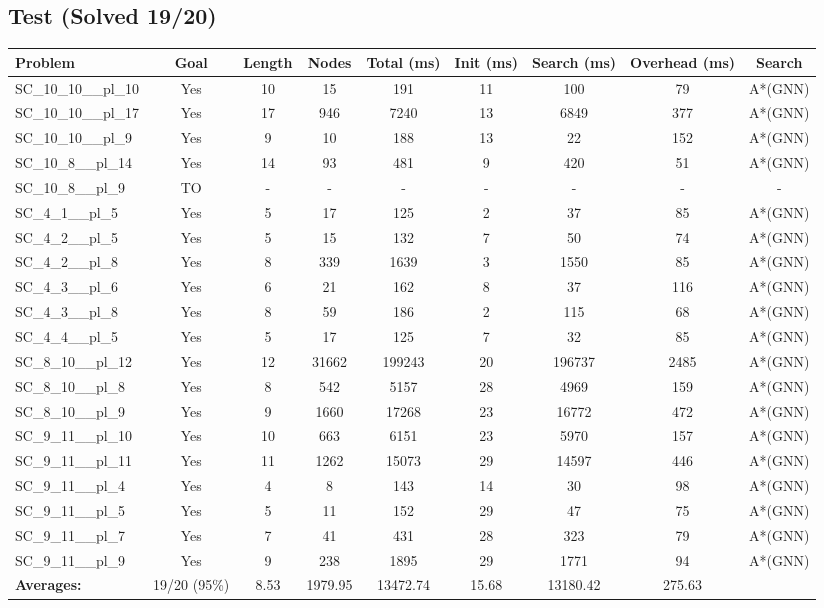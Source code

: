 \documentclass{article}
\begin{document}
\subsection*{Test (Solved 19/20)}
\begin{tabular}{lcccccccc}
\toprule
Problem & Goal & Length & Nodes & Total (ms) & Init (ms) & Search (ms) & Overhead (ms) & Search \\
\midrule
SC\_10\_10\_\_pl\_10 & Yes & 10 & 15 & 191 & 11 & 100 & 79 & A*(GNN) \\
SC\_10\_10\_\_pl\_17 & Yes & 17 & 946 & 7240 & 13 & 6849 & 377 & A*(GNN) \\
SC\_10\_10\_\_pl\_9 & Yes & 9 & 10 & 188 & 13 & 22 & 152 & A*(GNN) \\
SC\_10\_8\_\_pl\_14 & Yes & 14 & 93 & 481 & 9 & 420 & 51 & A*(GNN) \\
SC\_10\_8\_\_pl\_9 & TO & - & - & - & - & - & - & - \\
SC\_4\_1\_\_pl\_5 & Yes & 5 & 17 & 125 & 2 & 37 & 85 & A*(GNN) \\
SC\_4\_2\_\_pl\_5 & Yes & 5 & 15 & 132 & 7 & 50 & 74 & A*(GNN) \\
SC\_4\_2\_\_pl\_8 & Yes & 8 & 339 & 1639 & 3 & 1550 & 85 & A*(GNN) \\
SC\_4\_3\_\_pl\_6 & Yes & 6 & 21 & 162 & 8 & 37 & 116 & A*(GNN) \\
SC\_4\_3\_\_pl\_8 & Yes & 8 & 59 & 186 & 2 & 115 & 68 & A*(GNN) \\
SC\_4\_4\_\_pl\_5 & Yes & 5 & 17 & 125 & 7 & 32 & 85 & A*(GNN) \\
SC\_8\_10\_\_pl\_12 & Yes & 12 & 31662 & 199243 & 20 & 196737 & 2485 & A*(GNN) \\
SC\_8\_10\_\_pl\_8 & Yes & 8 & 542 & 5157 & 28 & 4969 & 159 & A*(GNN) \\
SC\_8\_10\_\_pl\_9 & Yes & 9 & 1660 & 17268 & 23 & 16772 & 472 & A*(GNN) \\
SC\_9\_11\_\_pl\_10 & Yes & 10 & 663 & 6151 & 23 & 5970 & 157 & A*(GNN) \\
SC\_9\_11\_\_pl\_11 & Yes & 11 & 1262 & 15073 & 29 & 14597 & 446 & A*(GNN) \\
SC\_9\_11\_\_pl\_4 & Yes & 4 & 8 & 143 & 14 & 30 & 98 & A*(GNN) \\
SC\_9\_11\_\_pl\_5 & Yes & 5 & 11 & 152 & 29 & 47 & 75 & A*(GNN) \\
SC\_9\_11\_\_pl\_7 & Yes & 7 & 41 & 431 & 28 & 323 & 79 & A*(GNN) \\
SC\_9\_11\_\_pl\_9 & Yes & 9 & 238 & 1895 & 29 & 1771 & 94 & A*(GNN) \\
\textbf{Averages:} & 19/20 (95\%) & 8.53 & 1979.95 & 13472.74 & 15.68 & 13180.42 & 275.63 & \\
\bottomrule
\end{tabular}
\\[0.7cm]
\end{document}
